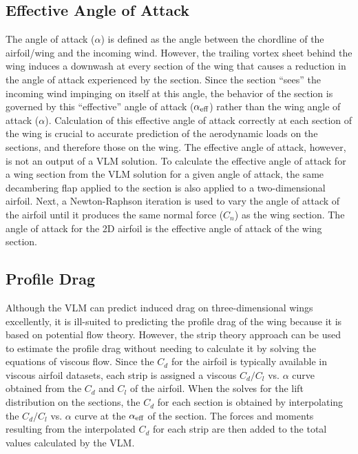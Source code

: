 \subsection{Effective Angle of Attack}
\label{sec:aeff}

The angle of attack ($\alpha$) is defined as the angle between the chordline of the airfoil/wing and the incoming wind.
However, the trailing vortex sheet behind the wing induces a downwash at every section of the wing that causes a reduction in the angle of attack experienced by the section. Since the section ``sees'' the incoming wind impinging on itself at this angle, the behavior of the section is governed by this ``effective'' angle of attack ($\alpha_\text{eff}{}$) rather than the wing angle of attack ($\alpha$). Calculation of this effective angle of attack correctly at each section of the wing is crucial to accurate prediction of the aerodynamic loads on the sections, and therefore those on the wing.
The effective angle of attack, however, is not an output of a VLM solution.
To calculate the effective angle of attack for a wing section from the VLM solution for a given angle of attack, the same decambering flap applied to the section is also applied to a two-dimensional airfoil. Next, a Newton-Raphson iteration is used to vary the angle of attack of the airfoil until it produces the same normal force ($C_n$) as the wing section. The angle of attack for the 2D airfoil is the effective angle of attack of the wing section.



\subsection{Profile Drag}
Although the VLM can predict induced drag on three-dimensional wings excellently, it is ill-suited to predicting the profile drag of the wing because it is based on potential flow theory. However, the strip theory approach can be used to estimate the profile drag without needing to calculate it by solving the equations of viscous flow. Since the $C_d$ for the airfoil is typically available in viscous airfoil datasets, each strip is assigned a viscous $C_d/C_l$ vs. $\alpha$ curve obtained from the $C_d$ and $C_l$ of the airfoil. When the \methodname solves for the lift distribution on the sections, the $C_d$ for each section is obtained by interpolating the $C_d/C_l$ vs. $\alpha$ curve at the $\alpha_\text{eff}{}$ of the section. The forces and moments resulting from the interpolated $C_d$ for each strip are then added to the total values calculated by the VLM.

